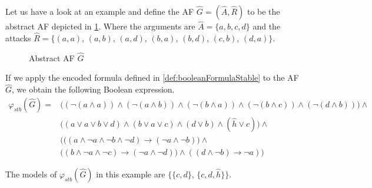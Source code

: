 \begin{example}
    Let us have a look at an example and define the AF $\hat{G}=(\hat{A}, \hat{R})$ to be the abstract AF depicted in \cref{af:algorithmEncodingsStable}. Where the arguments are $\hat{A}=\{a, b, c, d\}$ and the attacks $\hat{R}=\big\{ (a,a)$, $(a,b)$, $(a,d)$, $(b,a)$, $(b,d)$, $(c,b)$, $(d,a)\big\}$.

    \begin{figure}[H]
        \centering
        \caption{Abstract AF $\hat{G}$}
        \label{af:algorithmEncodingsStable}
    \end{figure}

If we apply the encoded formula defined in \cref{def:booleanFormulaStable} to the AF $\hat{G}$, we obtain the following Boolean expression.
\begin{align*}
    \varphi_{stb}(\hat{G}) = &\bigl( (\lnot (a \land a)) \land (\lnot (a \land b)) 
    \land (\lnot (b \land a)) \land (\lnot (b \land c)) \land (\lnot (d \land b)) \bigl) \land\\
    & \bigl( (a \lor a \lor b \lor d) \land (b \lor a \lor c) \land (d \lor b) \land (\hat{h} \lor c)\bigl) \land \\
    & \bigl( ((a \land \lnot a \land \lnot b \land \lnot d) \rightarrow (\lnot a \land \lnot b)\bigl) \land\\
    & \bigl((b \land \lnot a \land \lnot c) \rightarrow (\lnot a \land \lnot d)) \land ((d \land \lnot b) \rightarrow \lnot a)\bigl)
\end{align*}


The models of $\varphi_{stb}(\hat{G})$ in this example are $\bigl\{$$\{c, d\}$, $\{c, d, \hat{h}\} \bigl\}$.
\end{example}

